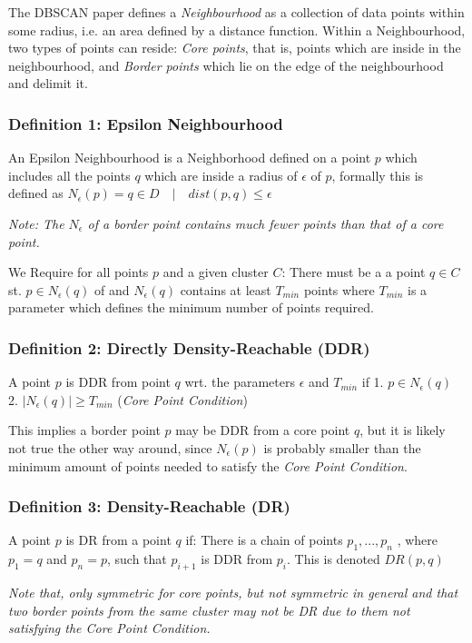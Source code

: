 The DBSCAN paper defines a \textit{Neighbourhood} as a collection of data points within some radius, i.e. an area defined by a distance function. Within a Neighbourhood, two types of points can reside: \textit{Core points}, that is, points which are inside in the neighbourhood, and \textit{Border points } which lie on the edge of the neighbourhood and delimit it. 

\subsubsection*{Definition 1: Epsilon Neighbourhood}
An Epsilon Neighbourhood is a Neighborhood defined on a point $p$ which includes all the points $q$ which are inside a radius of $\epsilon$ of $p$, formally this is defined as $N_{\epsilon} (p) = q \in D \quad|\quad dist(p,q) \leq \epsilon$

\textit{Note: The $N_{\epsilon}$ of a border point contains much fewer points than that of a core point. }

We Require for all points $p$ and a given cluster $C$: There must be a a point $q \in C$ st. $p \in N_{\epsilon}(q)$ of and $N_{\epsilon}(q)$ contains at least $T_{min}$ points where $T_{min}$ is a parameter which defines the minimum number of points required.

\subsubsection*{Definition 2: Directly Density-Reachable (DDR)}
A point $p$ is DDR from point $q$ wrt. the parameters $\epsilon$ and $T_{min}$ if
1. $p \in N_{\epsilon}(q)$
2. $|N_{\epsilon}(q)| \geq T_{min}$ (\textit{Core Point Condition})

This implies a border point $p$ may be DDR from a core point $q$, but it is likely not true the other way around, since $N_{\epsilon}(p)$ is probably smaller than the minimum amount of points needed to satisfy the \textit{Core Point Condition}.

\subsubsection*{Definition 3: Density-Reachable (DR)}
A point $p$ is DR from a point $q$ if:
There is a chain of points $p_1, ..., p_n$ , where $p_1 = q$ and $p_n = p$, such that $p_{i+1}$ is DDR from $p_i$.
This is denoted $DR(p,q)$

\textit{Note that, only symmetric for core points, but not symmetric in general and that two border points from the same cluster may not be DR due to them not satisfying the Core Point Condition.}

